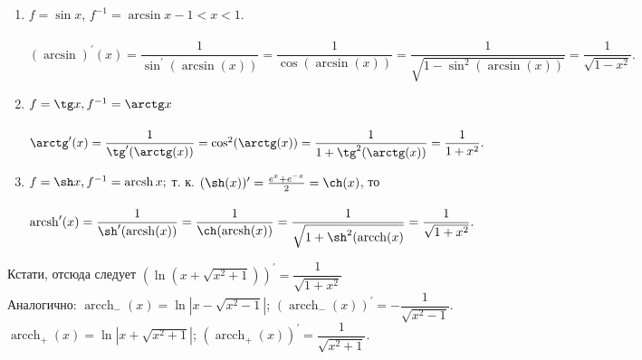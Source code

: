 \begin{example}
	\begin{enumerate}
		\item $f = \sin x$, $f^{-1} = \arcsin x -1 < x < 1$.\\\\
		$(\arcsin)^\prime(x) = \dfrac{1}{\sin^\prime(\arcsin(x))} = \dfrac{1}{\cos(\arcsin(x))} = \dfrac{1}{\sqrt{1 - \sin^2(\arcsin(x))}} = \dfrac{1}{\sqrt{1 - x^2}}.$
		\item $f = \tg x, f^{-1} = \arctg x$\\\\
		$\arctg^\prime(x) = \dfrac{1}{\tg^\prime(\arctg(x))} = \cos^2(\arctg(x)) = \dfrac{1}{1 + \tg^2(\arctg(x))} = \dfrac{1}{1 + x^2}.$
		\item $f = \sh x, f^{-1} = \operatorname{arcsh} x;$ т. к. $(\sh(x))^\prime = \frac{e^x + e^{-x}}{2} = \ch(x)$, то\\\\
		$\operatorname{arcsh}^\prime(x) = \dfrac{1}{\sh^\prime( \operatorname{arcsh}(x))} = \dfrac{1}{\ch( \operatorname{arcsh}(x))} = \dfrac{1}{\sqrt{1 + \sh^2(\operatorname{arcch}(x)}} = \dfrac{1}{\sqrt{1 + x^2}}.$
	\end{enumerate}
	Кстати, отсюда следует $(\ln(x + \sqrt{x^2 + 1}))^\prime = \dfrac{1}{\sqrt{1 + x^2}}$\\
	Аналогично: $ \operatorname{arcch}_-(x) = \ln|x - \sqrt{x^2 - 1}|$;  $(\operatorname{arcch}_-(x))^\prime = -\dfrac{1}{\sqrt{x^2 - 1}}$.\\ 
	$\operatorname{arcch}_+(x) = \ln|x + \sqrt{x^2 + 1}|$; $(\operatorname{arcch}_+(x))^\prime = \dfrac{1}{\sqrt{x^2 + 1}}$.
\end{example}

